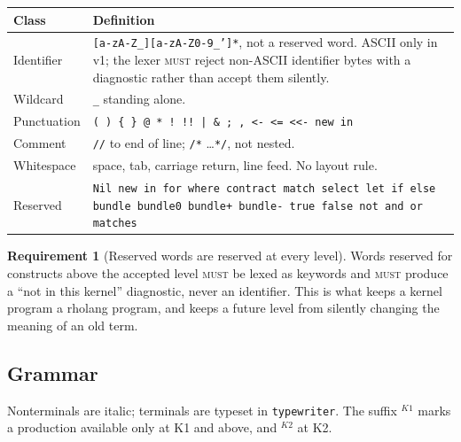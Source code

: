 \documentclass[11pt,a4paper]{article}
\newcommand{\code}[1]{\texttt{#1}}
\newcommand{\MUST}{\textsc{must}}
\theoremstyle{definition}
\newtheorem{requirement}[definition]{Requirement}
\theoremstyle{plain}
\begin{document}
\begin{center}
\begin{tabularx}{\linewidth}{@{}l>{\raggedright\arraybackslash}X@{}}
\toprule
Class & Definition\\
\midrule
Identifier & \code{[a-zA-Z\_][a-zA-Z0-9\_']*}, not a reserved word. ASCII only in
v1; the lexer \MUST{} reject non-ASCII identifier bytes with a diagnostic rather
than accept them silently.\\
Wildcard & \code{\_} standing alone.\\
Punctuation & \code{( ) \{ \} @ * ! !! | \& ; , <- <= <<- new in}\\
Comment & \code{//} to end of line; \code{/*} \ldots \code{*/}, not nested.\\
Whitespace & space, tab, carriage return, line feed. No layout rule.\\
Reserved & \code{Nil new in for where contract match select let if else bundle
bundle0 bundle+ bundle- true false not and or matches}\\
\bottomrule
\end{tabularx}
\end{center}

\begin{requirement}[Reserved words are reserved at every level]
Words reserved for constructs above the accepted level \MUST{} be lexed as
keywords and \MUST{} produce a ``not in this kernel'' diagnostic, never an
identifier. This is what keeps a kernel program a rholang program, and keeps a
future level from silently changing the meaning of an old term.
\end{requirement}

\subsection{Grammar}

Nonterminals are italic; terminals are typeset in \code{typewriter}. The suffix
$^{K1}$ marks a production available only at K1 and above, and $^{K2}$ at K2.
\end{document}
